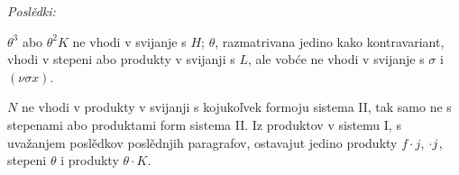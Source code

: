 \documentclass[11pt]{article}
\let\A\relax
\newcommand{\A}{\mathfrak A}
\begin{document}
\noindent\textit{Poslědki:}

$\theta^3$ abo $\theta^2K$ ne vhodi v svijanje s $H$; $\theta$, razmatrivana jedino kako kontravariant, vhodi v stepeni abo produkty v svijanji s $L$, ale vobće ne vhodi v svijanje s $\sigma$ i $(\nu\sigma x)$.

$N$ ne vhodi v produkty v svijanji s kojukoľvek formoju sistema II, tak samo ne s stepenami abo produktami form sistema II. Iz produktov v sistemu I, s uvažanjem poslědkov poslědnjih paragrafov, ostavajut jedino produkty $f\cdot j$, $\A\cdot j$, stepeni $\theta$ i produkty $\theta\cdot K$.
\end{document}
